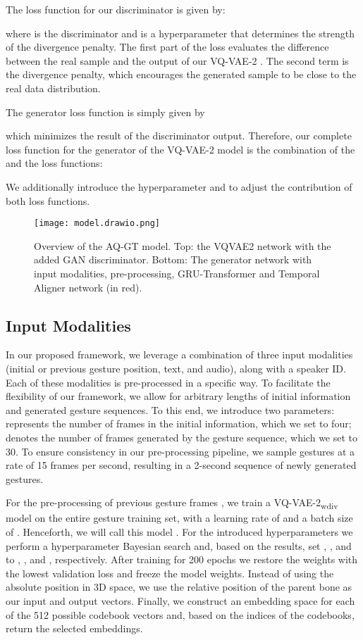 \documentclass[sigconf]{acmart}
\begin{document}
The loss function for our discriminator is given by:

where  is the discriminator and  is a hyperparameter that determines the strength of the divergence penalty. The first part of the loss  evaluates the difference between the real sample  and the output of our VQ-VAE-2 . The second term  is the divergence penalty, which encourages the generated sample  to be close to the real data distribution.

The generator loss function is simply given by

which minimizes the result of the discriminator output. Therefore, our complete loss function for the generator of the VQ-VAE-2 model is the combination of the  and the  loss functions: 

We additionally introduce the hyperparameter  and  to adjust the contribution of both loss functions.
 
\begin{figure*}[bth]
  \centering
  \texttt{[image: model.drawio.png]}
  \caption{Overview of the AQ-GT model. Top: the VQVAE2 network with the added GAN discriminator. Bottom: The generator network with input modalities, pre-processing, GRU-Transformer and Temporal Aligner network (in red).}
  \label{fig:model_overview}
\end{figure*}


\subsection{Input Modalities} \label{modalities}
In our proposed framework, we leverage a combination of three input modalities (initial or previous gesture position, text, and audio), along with a speaker ID. Each of these modalities is pre-processed in a specific way. To facilitate the flexibility of our framework, we allow for arbitrary lengths of initial information and generated gesture sequences. To this end, we introduce two parameters:  represents the number of frames in the initial information, which we set to four;  denotes the number of frames generated by the gesture sequence, which we set to 30. To ensure consistency in our pre-processing pipeline, we sample gestures at a rate of 15 frames per second, resulting in a 2-second sequence of newly generated gestures.

For the pre-processing of previous gesture frames , we train a VQ-VAE-2\textsubscript{wdiv} model on the entire gesture training set, with a learning rate of  and a batch size of . Henceforth, we will call this model . For the introduced hyperparameters we perform a hyperparameter Bayesian search and, based on the results, set , , and  to , , and , respectively. After training for 200 epochs we restore the weights with the lowest validation loss and freeze the model weights. Instead of using the absolute position in 3D space, we use the relative position of the parent bone as our input and output vectors. Finally, we construct an embedding space for each of the 512 possible codebook vectors and, based on the indices of the codebooks, return the selected embeddings.
\end{document}
